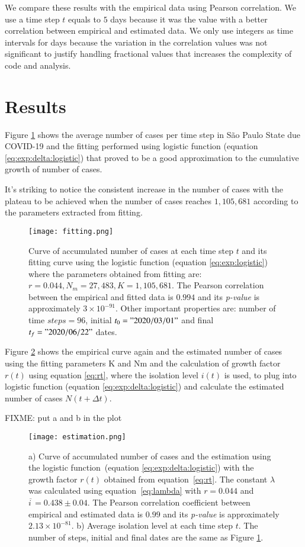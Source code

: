 \documentclass[review]{elsarticle}
\begin{document}
 We compare these results with the empirical data using Pearson correlation.
 We use a time step $t$ 
 equals to $5$ days because it was the value with
 a better correlation between empirical and estimated data. 
We only use integers as time intervals for days because
 the variation in the correlation values was not
 significant to justify handling fractional 
values  that increases the complexity
 of code and analysis.

\section{Results}

Figure \ref{fig:fitting} shows the average number of cases per 
time step in São Paulo State due COVID-19 and 
the fitting performed using logistic function (equation \ref{eq:exp:delta:logistic}) 
that proved to be a good approximation to the 
cumulative growth of number of cases.

It’s striking to notice the consistent increase in the number of cases 
with the plateau to be achieved when the number of cases reaches $1,105,681$ 
according to the parameters extracted from fitting.

\begin{figure}
\texttt{[image: fitting.png]}
\caption{Curve of accumulated number of cases 
at each time step $t$ and its fitting curve 
using the logistic function (equation \ref{eq:exp:logistic}) 
where the parameters obtained from fitting are: 
$r=0.044, N_m=27,483, K=1,105,681$. 
The Pearson correlation between the empirical 
and fitted data is $0.994$ and 
its {\it p-value\/} is approximately $3\times 10^{-91}$.  
Other important properties are: 
number of time $steps=96$, 
initial $t_{0}="2020/03/01"$ 
and final $t_{f}="2020/06/22"$ 
dates.}
\label{fig:fitting}
\end{figure}

Figure \ref{fig:estimation} shows the empirical curve again 
and the estimated number of cases using 
the fitting parameters K and Nm 
and the calculation of growth factor $r(t)$ using equation \ref{eq:rt}, 
where the isolation level $i(t)$ is used, 
to plug into logistic function (equation \ref{eq:exp:delta:logistic}) 
and calculate the estimated number of cases $N(t+\Delta t)$.

FIXME: put a and b in the plot
\begin{figure}
\centering
\texttt{[image: estimation.png]}
\caption{a) Curve of accumulated number of cases 
and the estimation using the logistic 
function~(equation \ref{eq:exp:delta:logistic}) 
with the growth factor $r(t)$ obtained from equation~\ref{eq:rt}. 
The constant $\lambda$ was calculated using equation~\ref{eq:lambda} with 
$r=0.044$ and \hbox{$\overline{i\,} = 0.438\pm 0.04$}. 
The Pearson correlation coefficient between empirical and estimated data is $0.99$ 
and its {\it p-value\/} is approximately \hbox{$2.13\times 10^{-81}$}. 
b) Average isolation level at each time step $t$. 
The number of steps, initial and final dates are 
the same as Figure \ref{fig:fitting}.}
\label{fig:estimation}
\end{figure}
\end{document}
